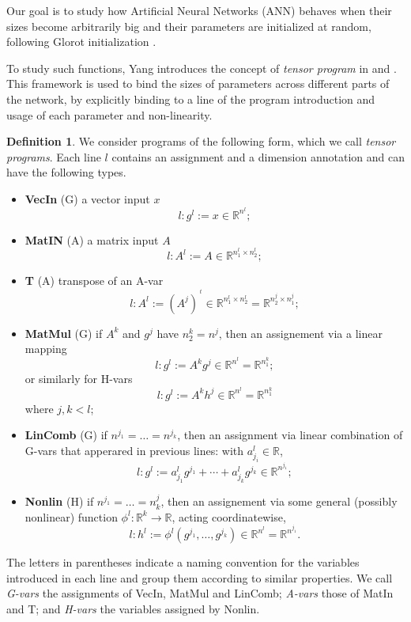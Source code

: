\documentclass[11pt,notitlepage]{article}
\numberwithin{equation}{section}
\def\R{{\mathbb{R}}}
\def\tr{{\,\!^t}}
\theoremstyle{remark}
\theoremstyle{definition}
\newtheorem{definition_body}[theorem]{Definition}
\newcommand{\definition}[1]{
	\theoremstyle{definition}
	\begin{definition_body}
		#1
	\end{definition_body}
	\theoremstyle{plain}
}
\begin{document}
	Our goal is to study how Artificial Neural Networks (ANN) behaves when their sizes become arbitrarily big and their parameters are initialized at random, following Glorot initialization \cite{glorot2010understanding}.
	
	To study such functions, Yang introduces the concept of \emph{tensor program} in \cite{yang2019scaling} and \cite{yang2019tensor}.
	This framework is used to bind the sizes of parameters across different parts of the network, by explicitly binding to a line of the program introduction and usage of each parameter and non-linearity.
	
	\definition{
		We consider programs of the following form, which we call \emph{tensor programs}. Each line $l$ contains an assignment and a dimension annotation and can have the following types.
		\begin{itemize}
			\item \textbf{VecIn} (G) a vector input $x$
			\[l: g^l := x \in \R^{n^l}; \]
			\item \textbf{MatIN} (A) a matrix input $A$
			\[l: A^l := A \in\R^{n^l_1 \times n^l_2}; \]
			\item \textbf{T} (A) transpose of an A-var
			\[l: A^l := (A^j)^\tr \in \R^{n^l_1 \times n^l_2} = \R^{n^j_2 \times n^j_1}; \]
			\item \textbf{MatMul} (G) if $A^k$ and $g^j$ have $n^k_2 = n^j$, then an assignement via a linear mapping
			\[l: g^l := A^kg^j \in \R^{n^l} = \R^{n_1^k}; \]
			or similarly for H-vars
			\[l: g^l := A^kh^j \in \R^{n^l} = \R^{n^k_1} \] where $j,k < l$;
			\item \textbf{LinComb} (G) if $n^{j_1} = \dots = n^{j_k}$, then an assignment via linear combination of G-vars that apperared in previous lines: with $a^l_{j_i} \in \R$,
			\[l: g^l := a^l_{j_1}g^{j_1} + \cdots + a^l_{j_k}g^{j_k} \in \R^{n^{j_1}}; \]
			\item \textbf{Nonlin} (H) if $n^{j_1} = \dots = n^j_k$, then an assignement via some general (possibly nonlinear) function $\phi^l : \R^k \rightarrow \R$, acting coordinatewise,
			\[l: h^l := \phi^l( g^{j_1}, \dots, g^{j_k}) \in \R^{n^l} = \R^{n^{j_1}}. \]
		\end{itemize}
		
		The letters in parentheses indicate a naming convention for the variables introduced in each line and group them according to similar properties.
		We call \emph{G-vars} the assignments of VecIn, MatMul and LinComb; \emph{A-vars} those of MatIn and T; and \emph{H-vars} the variables assigned by Nonlin.
		
	}
	
\end{document}
